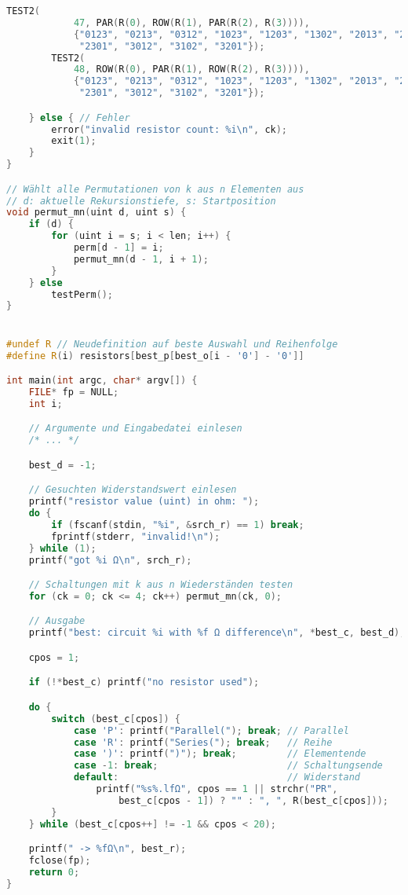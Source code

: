 \documentclass[a4paper,10pt,ngerman]{scrartcl}
\begin{document}
\begin{lstlisting}[language=C++]
        TEST2(
            47, PAR(R(0), ROW(R(1), PAR(R(2), R(3)))),
            {"0123", "0213", "0312", "1023", "1203", "1302", "2013", "2103",
             "2301", "3012", "3102", "3201"});
        TEST2(
            48, ROW(R(0), PAR(R(1), ROW(R(2), R(3)))),
            {"0123", "0213", "0312", "1023", "1203", "1302", "2013", "2103",
             "2301", "3012", "3102", "3201"});

    } else { // Fehler
        error("invalid resistor count: %i\n", ck);
        exit(1);
    }
}

// Wählt alle Permutationen von k aus n Elementen aus
// d: aktuelle Rekursionstiefe, s: Startposition
void permut_mn(uint d, uint s) {
    if (d) {
        for (uint i = s; i < len; i++) {
            perm[d - 1] = i;
            permut_mn(d - 1, i + 1);
        }
    } else
        testPerm();
}


#undef R // Neudefinition auf beste Auswahl und Reihenfolge
#define R(i) resistors[best_p[best_o[i - '0'] - '0']]

int main(int argc, char* argv[]) {
    FILE* fp = NULL;
    int i;

    // Argumente und Eingabedatei einlesen
    /* ... */

    best_d = -1;

    // Gesuchten Widerstandswert einlesen
    printf("resistor value (uint) in ohm: ");
    do {
        if (fscanf(stdin, "%i", &srch_r) == 1) break;
        fprintf(stderr, "invalid!\n");
    } while (1);
    printf("got %i Ω\n", srch_r);

    // Schaltungen mit k aus n Wiederständen testen
    for (ck = 0; ck <= 4; ck++) permut_mn(ck, 0);

    // Ausgabe
    printf("best: circuit %i with %f Ω difference\n", *best_c, best_d);

    cpos = 1;

    if (!*best_c) printf("no resistor used");

    do {
        switch (best_c[cpos]) {
            case 'P': printf("Parallel("); break; // Parallel
            case 'R': printf("Series("); break;   // Reihe
            case ')': printf(")"); break;         // Elementende
            case -1: break;                       // Schaltungsende
            default:                              // Widerstand
                printf("%s%.lfΩ", cpos == 1 || strchr("PR",
                    best_c[cpos - 1]) ? "" : ", ", R(best_c[cpos]));
        }
    } while (best_c[cpos++] != -1 && cpos < 20);

    printf(" -> %fΩ\n", best_r);
    fclose(fp);
    return 0;
}

\end{lstlisting}
\end{document}
